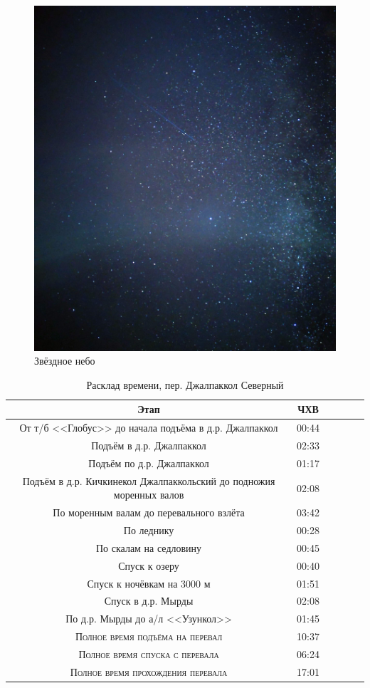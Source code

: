 \begin{figure}[h!]	
	\centering
	\includegraphics[angle=0, width=0.7\linewidth]{../pics/IMG_20240823_205116}
	\caption{Звёздное небо}
	\label{fig:IMG_20240823_205116}
\end{figure}
 

 
 \begin{table}[h!]
 	\centering
 	\begin{tabular}{|c|c|c|c|c|c|} 
 		\hline 
 		Этап & ЧХВ \\ 	
 		\hline 
 		От т/б <<Глобус>> до начала подъёма в д.р. Джалпаккол  & 00:44 \\
 		Подъём в д.р. Джалпаккол  & 02:33 \\
 		Подъём по д.р. Джалпаккол & 01:17\\ 
 		Подъём в д.р. Кичкинекол Джалпаккольский до подножия моренных валов & 02:08\\ 
 		По моренным валам до перевального взлёта & 03:42\\ 
 		По леднику & 00:28 \\
 		По скалам на седловину & 00:45 \\
 		Спуск к озеру & 00:40 \\
 		Спуск к ночёвкам на 3000 м & 01:51 \\
 		Спуск в д.р. Мырды & 02:08 \\
 		По д.р. Мырды до а/л <<Узункол>>& 01:45 \\
 		\hline
 		\textsc{Полное время подъёма на перевал  }& 10:37\\
 		\textsc{Полное время спуска с перевала }& 06:24 \\
 		\textsc{	Полное время прохождения перевала }& 17:01 \\
 		\hline
 	\end{tabular}
 	\caption{Расклад времени, пер. Джалпаккол Северный}
 \end{table}
 
